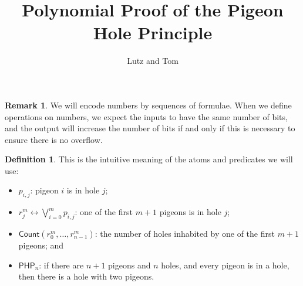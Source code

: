 \documentclass[a4paper,10pt,draft]{article}
\title{Polynomial Proof of the Pigeon Hole Principle}
\author{Lutz and Tom}
\theoremstyle{plain}
\theoremstyle{definition}
\newtheorem{definition}[theorem]{Definition}
\newtheorem{remark}[theorem]{Remark}
\begin{document}
\maketitle

\newcommand{\fff  }{{\mathsf{f}}}
\newcommand{\ttt  }{{\mathsf{t}}}
\newcommand{\ai   }{{\mathsf{ai}}}
\newcommand{\aw   }{{\mathsf{aw}}}
\newcommand{\ac   }{{\mathsf{ac}}}
\newcommand{\aid  }{{\ai{\downarrow}}}
\newcommand{\awd  }{{\aw{\downarrow}}}
\newcommand{\acd  }{{\ac{\downarrow}}}
\newcommand{\aiu  }{{\ai{\uparrow}}}
\newcommand{\awu  }{{\aw{\uparrow}}}
\newcommand{\acu  }{{\ac{\uparrow}}}
\newcommand{\swi  }{\mathsf{s}}
\newcommand{\med  }{\mathsf{m}}
\newcommand{\asor }{{=_\mathsf{a}{\downarrow}}}
\newcommand{\asand}{{=_\mathsf{a}{\uparrow}}}
\newcommand{\coor }{{=_{\vee\mathsf{c}}}}
\newcommand{\coand}{{=_{\wedge\mathsf{c}}}}
\newcommand{\fffd }{{{=_{\fff}}{\downarrow}}}
\newcommand{\fffu }{{{=_{\fff}}{\uparrow}}}
\newcommand{\tttd }{{{=_{\ttt}}{\downarrow}}}
\newcommand{\tttu }{{{=_{\ttt}}{\uparrow}}}
\newcommand{\tttord }{{{=_{\ttt\vee}}{\downarrow}}}
\newcommand{\fffandd }{{{=_{\fff\wedge}}{\downarrow}}}
\newcommand{\tttoru }{{{=_{\ttt\vee}}{\uparrow}}}
\newcommand{\fffandu }{{{=_{\fff\wedge}}{\uparrow}}}

\newcommand{\AND}[2]{\bigwedge_{#1}^{#2}}
\newcommand{\OR}[2]{\bigvee_{#1}^{#2}}

\newcommand{\Count}{\mathsf{Count}}
\newcommand{\PHP}[1]{\mathsf{PHP}_{#1}}

\begin{remark}
We will encode numbers by sequences of formulae. When we define operations on numbers, we expect the inputs to have the same number of bits, and the output will increase the number of bits if and only if this is necessary to ensure there is no overflow.
\end{remark}

\begin{definition}
This is the intuitive meaning of the atoms and predicates we will use:
\begin{itemize}
 \item $p_{i,j}$: pigeon $i$ is in hole $j$;
 \item $r_j^m\leftrightarrow\OR{i=0}{m}p_{i,j}$: one of the first $m+1$ pigeons is in hole $j$;
 \item $\Count(r_0^m,\dots,r_{n-1}^m)$: the number of holes inhabited by one of the first $m+1$ pigeons; and
 \item $\PHP{n}$: if there are $n+1$ pigeons and $n$ holes, and every pigeon is in a hole, then there is a hole with two pigeons.
\end{itemize}
\end{definition}
\end{document}
